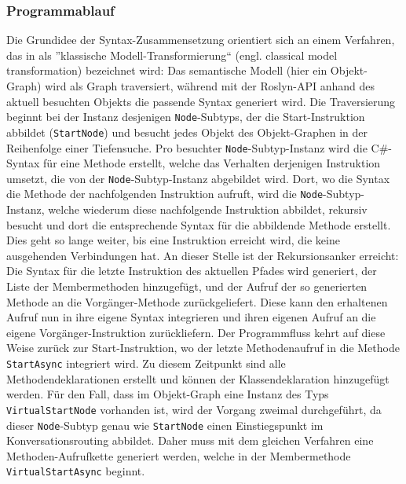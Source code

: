 \subsubsection{Programmablauf}
\label{subsubsec:Programablauf}
Die Grundidee der Syntax-Zusammensetzung orientiert sich an einem Verfahren, das in \cite[S. 272f]{Voelter:13} als ''klassische Modell-Transformierung`` (engl. classical model transformation) bezeichnet wird: Das semantische Modell (hier ein Objekt-Graph) wird als Graph traversiert, während mit der Roslyn-API anhand des aktuell besuchten Objekts die passende Syntax generiert wird. Die Traversierung beginnt bei der Instanz desjenigen \texttt{Node}-Subtyps, der die Start-Instruktion abbildet (\texttt{StartNode}) und besucht jedes Objekt des Objekt-Graphen in der Reihenfolge einer Tiefensuche. Pro besuchter \texttt{Node}-Subtyp-Instanz wird die C\#-Syntax für eine Methode erstellt, welche das Verhalten derjenigen Instruktion umsetzt, die von der \texttt{Node}-Subtyp-Instanz abgebildet wird. Dort, wo die Syntax die Methode der nachfolgenden Instruktion aufruft, wird die \texttt{Node}-Subtyp-Instanz, welche wiederum diese nachfolgende Instruktion abbildet, rekursiv besucht und dort die entsprechende Syntax für die abbildende Methode erstellt. Dies geht so lange weiter, bis eine Instruktion erreicht wird, die keine ausgehenden Verbindungen hat. An dieser Stelle ist der Rekursionsanker erreicht: Die Syntax für die letzte Instruktion des aktuellen Pfades wird generiert, der Liste der Membermethoden hinzugefügt, und der Aufruf der so generierten Methode an die Vorgänger-Methode zurückgeliefert. Diese kann den erhaltenen Aufruf nun in ihre eigene Syntax integrieren und ihren eigenen Aufruf an die eigene Vorgänger-Instruktion zurückliefern. Der Programmfluss kehrt auf diese Weise zurück zur Start-Instruktion, wo der letzte Methodenaufruf in die Methode \texttt{StartAsync} integriert wird. Zu diesem Zeitpunkt sind alle Methodendeklarationen erstellt und können der Klassendeklaration hinzugefügt werden. Für den Fall, dass im Objekt-Graph eine Instanz des Typs \texttt{VirtualStartNode} vorhanden ist, wird der Vorgang zweimal durchgeführt, da dieser \texttt{Node}-Subtyp genau wie \texttt{StartNode} einen Einstiegspunkt im Konversationsrouting abbildet. Daher muss mit dem gleichen Verfahren eine Methoden-Aufrufkette generiert werden, welche in der Membermethode \texttt{VirtualStartAsync} beginnt.
\newline
